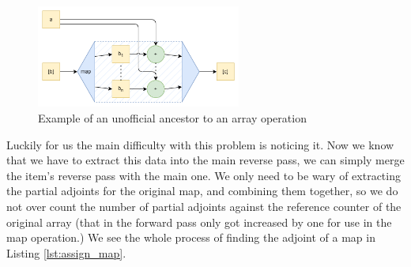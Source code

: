             \begin{figure}[htb]
                \centering
                \includegraphics[width=0.6\textwidth]{diagrams/map_example.png}
                \caption{Example of an unofficial ancestor to an array operation}
                \label{fig:map_graph}
            \end{figure}

            Luckily for us the main difficulty with this problem is noticing it.
            Now we know that we have to extract this data into the main reverse pass, we can simply merge the item's reverse pass with the main one.
            We only need to be wary of extracting the partial adjoints for the original map, and combining them together, so we do not over count the number of partial adjoints against the reference counter of the original array (that in the forward pass only got increased by one for use in the map operation.)
            We see the whole process of finding the adjoint of a map in Listing \ref{lst:assign_map}.

